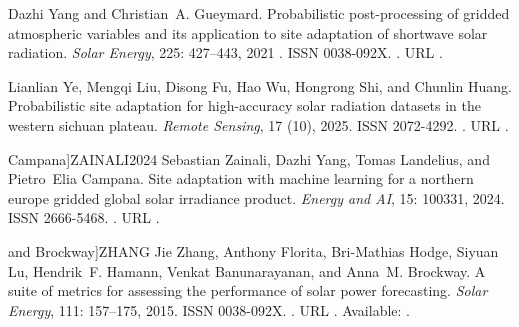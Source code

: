\documentclass[letterpaper,12pt, twoside]{report}
\providecommand{\DIFdeltex}[1]{{\protect\color{red} \scriptsize #1}} %
\providecommand{\DIFdel}[1]{\texorpdfstring{\DIFdeltex{#1}}{}} %
\begin{document}
\DIFdel{Dazhi Yang and Christian~A. Gueymard.
}%
\DIFdel{Probabilistic post-processing of gridded atmospheric variables and
  its application to site adaptation of shortwave solar radiation.
}%
\DIFdel{\emph{Solar Energy}, 225:}%
\DIFdel{427--443, 2021}%
\DIFdel{.
}%
\DIFdel{ISSN 0038-092X.
}%
\DIFdel{.
}%
\DIFdel{URL
  }%
\DIFdel{.
}%

\DIFdel{Lianlian Ye, Mengqi Liu, Disong Fu, Hao Wu, Hongrong Shi, and Chunlin Huang.
}%
\DIFdel{Probabilistic site adaptation for high-accuracy solar radiation
  datasets in the western sichuan plateau.
}%
\DIFdel{\emph{Remote Sensing}, 17}%
\DIFdel{(10), 2025.
}%
\DIFdel{ISSN 2072-4292.
}%
\DIFdel{.
}%
\DIFdel{URL }%
\DIFdel{.
}%

  Campana]{ZAINALI2024}
\DIFdel{Sebastian Zainali, Dazhi Yang, Tomas Landelius, and Pietro~Elia Campana.
}%
\DIFdel{Site adaptation with machine learning for a northern europe gridded
  global solar irradiance product.
}%
\DIFdel{\emph{Energy and AI}, 15:}%
\DIFdel{100331, 2024.
}%
\DIFdel{ISSN 2666-5468.
}%
\DIFdel{.
}%
\DIFdel{URL
  }%
\DIFdel{.
}%

  and Brockway]{ZHANG}
\DIFdel{Jie Zhang, Anthony Florita, Bri-Mathias Hodge, Siyuan Lu, Hendrik~F. Hamann,
  Venkat Banunarayanan, and Anna~M. Brockway.
}%
\DIFdel{A suite of metrics for assessing the performance of solar power
  forecasting.
}%
\DIFdel{\emph{Solar Energy}, 111:}%
\DIFdel{157--175, 2015.
}%
\DIFdel{ISSN 0038-092X.
}%
\DIFdel{.
}%
\DIFdel{URL
  }%
\DIFdel{.
}%
\DIFdel{Available: }%
\DIFdel{.
}%
\end{document}
